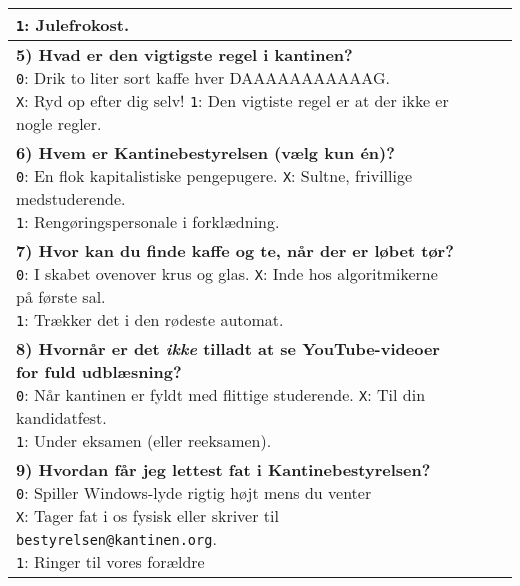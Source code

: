\documentclass[a4paper]{article}
\begin{document}
\begin{center}
\begin{tabular}{|p{12cm}|p{0.2cm}|p{0.2cm}|p{0.2cm}|}
{  \texttt{1}: Julefrokost.
  \vspace{0.1cm}
} & & & \\\hline
\parbox{12cm}{
  \vspace{0.2cm}
  \textbf{5) Hvad er den vigtigste regel i kantinen?} \\
  \texttt{0}: Drik to liter sort kaffe hver DAAAAAAAAAAAG. \quad\\
  \texttt{X}: Ryd op efter dig selv! \quad
  \texttt{1}: Den vigtiste regel er at der ikke er nogle regler.
  \vspace{0.1cm}
} & & & \\\hline
\parbox{12cm}{
  \vspace{0.2cm}
  \textbf{6) Hvem er Kantinebestyrelsen (vælg kun én)?} \\
  \texttt{0}: En flok kapitalistiske pengepugere. \quad
  \texttt{X}: Sultne, frivillige medstuderende. \\
  \texttt{1}: Rengøringspersonale i forklædning.
  \vspace{0.1cm}
} & & & \\\hline
\parbox{12cm}{
  \vspace{0.2cm}
  \textbf{7) Hvor kan du finde kaffe og te, når der er løbet tør?} \\
  \texttt{0}: I skabet ovenover krus og glas. \quad
  \texttt{X}: Inde hos algoritmikerne på første sal. \\
  \texttt{1}: Trækker det i den rødeste automat.
  \vspace{0.1cm}
} & & & \\\hline
\parbox{12cm}{
  \vspace{0.2cm}
  \textbf{8) Hvornår er det \emph{ikke} tilladt at se YouTube-videoer for fuld
  udblæsning?} \\
  \texttt{0}: Når kantinen er fyldt med flittige studerende. \quad
  \texttt{X}: Til din kandidatfest. \\
  \texttt{1}: Under eksamen (eller reeksamen).
  \vspace{0.1cm}
} & & & \\\hline
\parbox{12cm}{
  \vspace{0.2cm}
  \textbf{9) Hvordan får jeg lettest fat i Kantinebestyrelsen?} \\
  \texttt{0}: Spiller Windows-lyde rigtig højt mens du venter \quad \\
  \texttt{X}: Tager fat i os fysisk eller skriver til \texttt{bestyrelsen@kantinen.org}. \\
  \texttt{1}: Ringer til vores forældre
  \vspace{0.1cm}
}
\end{tabular}
\end{center}
\end{document}
